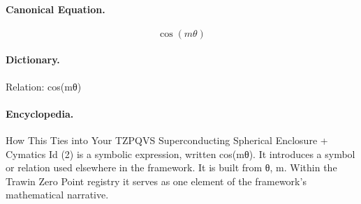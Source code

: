 \paragraph{Canonical Equation.}
\[
\cos(m\theta)
\]

\paragraph{Dictionary.}
Relation: cos(mθ)

\paragraph{Encyclopedia.}
How This Ties into Your TZPQVS Superconducting Spherical Enclosure + Cymatics Id (2) is a symbolic expression, written cos(mθ). It introduces a symbol or relation used elsewhere in the framework. It is built from θ, m. Within the Trawin Zero Point registry it serves as one element of the framework's mathematical narrative.

